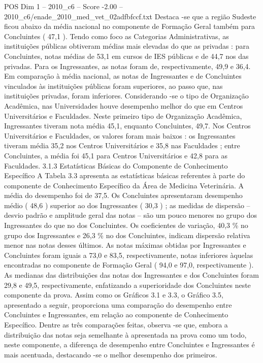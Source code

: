 \begin{textsample}{POS Dim 1 – 2010\_c6 – Score -2.00 – 2010\_c6/enade\_2010\_med\_vet\_02adfbfccf.txt}
Destaca -se que a região Sudeste ficou abaixo da média nacional no componente de Formação Geral também para Concluintes ( 47,1 ).
Tendo como foco as Categorias Administrativas, as instituições públicas obtiveram médias mais elevadas do que as privadas : para Concluintes, notas médias de 53,1 em cursos de IES públicas e de 44,7 nos das privadas.
Para os Ingressantes, as notas foram de, respectivamente, 49,9 e 36,4.
Em comparação à média nacional, as notas de Ingressantes e de Concluintes vinculados às instituições públicas foram superiores, ao passo que, nas instituições privadas, foram inferiores.
Considerando -se o tipo de Organização Acadêmica, nas Universidades houve desempenho melhor do que em Centros Universitários e Faculdades.
Neste primeiro tipo de Organização Acadêmica, Ingressantes tiveram nota média 45,1, enquanto Concluintes, 49,7.
Nos Centros Universitários e Faculdades, os valores foram mais baixos : os Ingressantes tiveram média 35,2 nos Centros Universitários e 35,8 nas Faculdades ; entre Concluintes, a média foi 45,1 para Centros Universitários e 42,8 para as Faculdades. 3.1.3 Estatísticas Básicas do Componente de Conhecimento Específico A Tabela 3.3 apresenta as estatísticas básicas referentes à parte do componente de Conhecimento Específico da Área de Medicina Veterinária.
A média do desempenho foi de 37,5.
Os Concluintes apresentaram desempenho médio ( 48,6 ) superior ao dos Ingressantes ( 30,3 ) ; as medidas de dispersão – desvio padrão e amplitude geral das notas – são um pouco menores no grupo dos Ingressantes do que no dos Concluintes.
Os coeficientes de variação, 40,3 \% no grupo dos Ingressantes e 26,3 \% no dos Concluintes, indicam dispersão relativa menor nas notas desses últimos.
As notas máximas obtidas por Ingressantes e Concluintes foram iguais a 73,0 e 83,5, respectivamente, notas inferiores àquelas encontradas no componente de Formação Geral ( 94,0 e 97,0, respectivamente ).
As medianas das distribuições das notas dos Ingressantes e dos Concluintes foram 29,8 e 49,5, respectivamente, enfatizando a superioridade dos Concluintes neste componente da prova.
Assim como os Gráficos 3.1 e 3.3, o Gráfico 3.5, apresentado a seguir, proporciona uma comparação do desempenho entre Concluintes e Ingressantes, em relação ao componente de Conhecimento Específico.
Dentre as três comparações feitas, observa -se que, embora a distribuição das notas seja semelhante à apresentada na prova como um todo, neste componente, a diferença de desempenho entre Concluintes e Ingressantes é mais acentuada, destacando -se o melhor desempenho dos primeiros.

\end{textsample}
